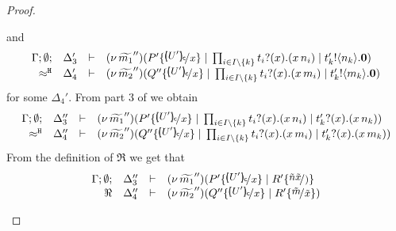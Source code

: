 \begin{proof}
\begin{enumerate}
\begin{enumerate}[i.]
							and
							\begin{eqnarray}
							\mhorel{\Gamma}{\Delta_3'}{  \newsp{\widetilde{m_1}''}{P' \subst{\omapchar{U'}}{x} \Par \prod_{i \in I\backslash{\set{k}}} \binp{t_i}{x} (\appl{x}{n_i}) \Par
									\bout{t'_k}{n_k} \inact}}
							{ \hwb }
							{\Delta_4'}{}{\newsp{\widetilde{m_2}''}{Q'' \subst{\omapchar{U'}}{x} \Par \prod_{i \in I\backslash{\set{k}}} \binp{t_i}{x} (\appl{x}{m_i}) \Par \bout{t'_k}{m_k} \inact}}
							\label{lem:tr_subst_41}
							\end{eqnarray}
							for some $\Delta_4'$.
							From part 3 of  we obtain
							\begin{eqnarray}
								\mhorel{\Gamma}{\Delta_3''}{  \newsp{\widetilde{m_1}''}{P' \subst{\omapchar{U'}}{x} \Par \prod_{i \in I\backslash{\set{k}}} \binp{t_i}{x} (\appl{x}{n_i}) \Par
								\binp{t'_k}{x} (\appl{x}{n_k})}}
								{ \hwb }
								{\Delta_4''}{}{\newsp{\widetilde{m_2}''}{Q'' \subst{\omapchar{U'}}{x} \Par \prod_{i \in I\backslash{\set{k}}} \binp{t_i}{x} (\appl{x}{m_i}) \Par \binp{t'_k}{x} (\appl{x}{m_k})}}
								\label{lem:tr_subst_442}
							\end{eqnarray}
							From the definition of $\Re$ we get
							that
							\begin{eqnarray*}
							\mhorel{\Gamma}{\Delta_3''}{  \newsp{\widetilde{m_1}''}{P' \subst{\omapchar{U'}}{x} \Par R' \subst{\tilde{n}{\tilde{x}}}}}
							{ \Re }
							{\Delta_4''}{}{\newsp{\widetilde{m_2}''}{Q'' \subst{\omapchar{U'}}{x} \Par R' \subst{\tilde{m}}{\tilde{x}}}}
							\end{eqnarray*}

\end{enumerate}
\end{enumerate}
\end{proof}
